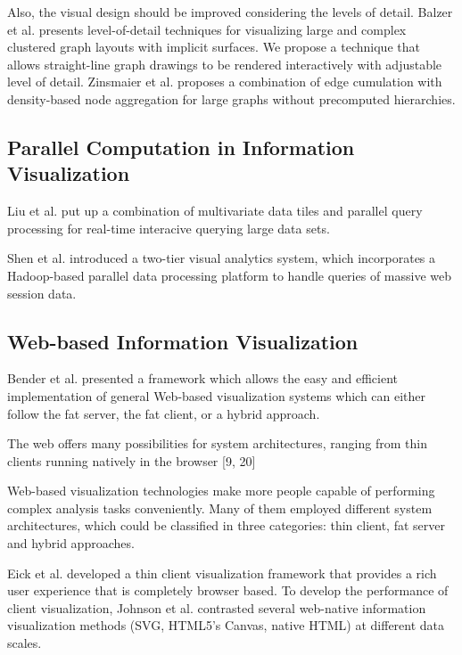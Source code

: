 \documentclass{article}
\begin{document}
Also, the visual design should be improved considering the levels of detail.
Balzer et al.\cite{balzer2007level} presents level-of-detail techniques for visualizing large and complex clustered graph layouts with implicit surfaces.
We propose a technique that allows straight-line graph drawings to be rendered interactively with adjustable level of detail.
Zinsmaier et al.\cite{zinsmaier2012interactive} proposes a combination of edge cumulation with density-based node aggregation for large graphs without precomputed hierarchies.


\subsection{Parallel Computation in Information Visualization}


Liu et al.\cite{liu2013immens} put up a combination of multivariate data tiles and parallel query processing for real-time interacive querying large data sets.


Shen et al.\cite{shen2012visual} introduced a two-tier visual analytics system, which incorporates a Hadoop-based parallel data processing platform to handle queries of massive web session data.
\subsection{Web-based Information Visualization}


Bender et al.\cite{bender2000functional} presented a framework which allows the easy and efficient implementation of general Web-based visualization systems which can either follow the fat server, the fat client, or a hybrid approach.



The web offers many possibilities for system architectures, ranging from thin clients running natively in the browser [9, 20] 

Web-based visualization technologies make more people capable of performing complex analysis tasks conveniently. Many of them employed different system architectures, which could be classified in three categories\cite{bostock2009protovis}: thin client, fat server and hybrid approaches.

 Eick et al.\cite{eick2007thin} developed a thin client visualization framework that provides a rich user experience that is completely browser based.
 To develop the performance of client visualization, Johnson et al.\cite{johnson2008scalability} contrasted several web-native information visualization methods (SVG, HTML5's Canvas, native HTML) at different data scales.
 
\end{document}
